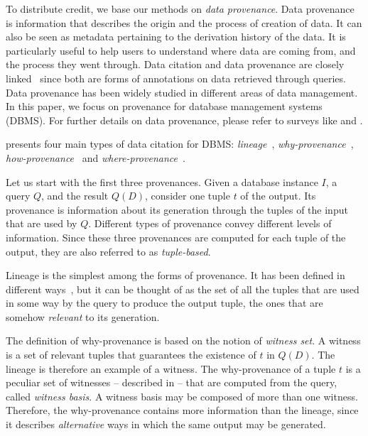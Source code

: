 To distribute credit, we base our methods on \emph{data provenance}. 
Data provenance is information that describes the origin and the process of creation of data. It can also be seen as metadata pertaining to the derivation history of the data. 
It is particularly useful to help users to understand where data are coming from, and the process they went through. 
Data citation and data provenance are closely linked~\citep{AlawiniDSTW17} since both are forms of annotations on data retrieved through queries. 
Data provenance has been widely studied in different areas of data management. 
In this paper, we focus on provenance for database management systems (DBMS). For further details on data provenance, please refer to surveys like \citep{CheneyProvSurvey} and \citep{SimmhanPG05}.

\citet{CheneyProvSurvey} presents four main types of data citation for DBMS: \emph{lineage}~\citep{lineageCui}, \emph{why-provenance}~\citep{WhyProvBuneman}, \emph{how-provenance}~\citep{howProvenanceGreen} and \emph{where-provenance}~\citep{WhyProvBuneman}.

Let us start with the first three provenances. Given a database instance $I$, a query $Q$, and the result $Q(D)$, consider one tuple $t$ of the output. 
Its provenance is information about its generation through the tuples of the input that are used by $Q$. Different types of provenance convey different levels of information. Since these three provenances are computed for each tuple of the output, they are also referred to as \emph{tuple-based}.

Lineage is the simplest among the forms of provenance. It has been defined in different ways~\citep{CheneyProvSurvey}, but it can be thought of as the set of all the tuples that are used in some way by the query to produce the output tuple, the ones that are somehow \emph{relevant} to its generation. 

The definition of why-provenance is based on the notion of \emph{witness set}. A witness is a set of relevant tuples that guarantees the existence of $t$ in $Q(D)$. The lineage is therefore an example of a witness. The why-provenance of a tuple $t$ is a peculiar set of witnesses  -- described in \citep{WhyProvBuneman} -- that are computed from the query, called \emph{witness basis}. 
A witness basis may be composed of more than one witness. 
Therefore, the why-provenance contains more information than the lineage, since it describes \emph{alternative} ways in which the same output may be generated. 

